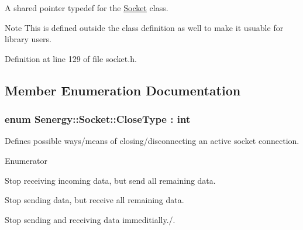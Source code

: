 A shared pointer typedef for the \hyperlink{class_senergy_1_1_socket}{Socket} class. 

\begin{DoxyNote}{Note}
This is defined outside the class definition as well to make it usuable for library users. 
\end{DoxyNote}


Definition at line 129 of file socket.\-h.



\subsection{Member Enumeration Documentation}
\hypertarget{class_senergy_1_1_socket_a88ed1eb1a5c47ea1b395715aabd37ab4}{
\subsubsection[{Close\-Type}]{\setlength{\rightskip}{0pt plus 5cm}enum {\bf Senergy\-::\-Socket\-::\-Close\-Type} \-: int\hspace{0.3cm}{\ttfamily [strong]}}}\label{class_senergy_1_1_socket_a88ed1eb1a5c47ea1b395715aabd37ab4}


Defines possible ways/means of closing/disconnecting an active socket connection. 

\begin{Desc}
\item[Enumerator]\par
\begin{description}
\item[{\em 
\hypertarget{class_senergy_1_1_socket_a88ed1eb1a5c47ea1b395715aabd37ab4a1851aea8452370ffbc6364027d018da9}{Stop\-Receiving}\label{class_senergy_1_1_socket_a88ed1eb1a5c47ea1b395715aabd37ab4a1851aea8452370ffbc6364027d018da9}
}]Stop receiving incoming data, but send all remaining data. \item[{\em 
\hypertarget{class_senergy_1_1_socket_a88ed1eb1a5c47ea1b395715aabd37ab4a948c383a847087d69042e091d164380b}{Stop\-Sending}\label{class_senergy_1_1_socket_a88ed1eb1a5c47ea1b395715aabd37ab4a948c383a847087d69042e091d164380b}
}]Stop sending data, but receive all remaining data. \item[{\em 
\hypertarget{class_senergy_1_1_socket_a88ed1eb1a5c47ea1b395715aabd37ab4a40b522922220c34afd8e1d4a3ba02208}{Stop\-All}\label{class_senergy_1_1_socket_a88ed1eb1a5c47ea1b395715aabd37ab4a40b522922220c34afd8e1d4a3ba02208}
}]Stop sending and receiving data immeditially./. \end{description}
\end{Desc}


